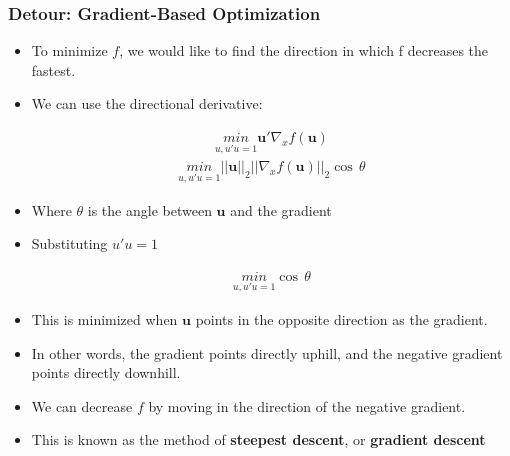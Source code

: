 \documentclass[
  shownotes,
  xcolor={svgnames},
  hyperref={colorlinks,citecolor=DarkBlue,linkcolor=DarkRed,urlcolor=DarkBlue}
  , aspectratio=169]{beamer}
\begin{document}
\begin{frame}[fragile]
\frametitle{Detour: Gradient-Based Optimization}

\begin{itemize}
\item To minimize $f$, we would like to find the direction in which f decreases the fastest. 
\item We can use the directional derivative:

\begin{align}
\underset{u,u'u=1}{min}\mathbf{u}'\nabla_x f(\mathbf{u}) 
\end{align}
\begin{align}
\underset{u,u'u=1}{min}||\mathbf{u}||_2||\nabla_x f(\mathbf{u})||_2 \cos\,\theta 
\end{align}

\item Where $\theta$ is the angle between $\mathbf{u}$ and the gradient
\item Substituting $u'u=1$ 

\begin{align}
\underset{u,u'u=1}{min} \cos\,\theta 
\end{align}

\item This is minimized when $\mathbf{u}$ points in the opposite direction as the gradient.
\item In other words, the gradient points directly uphill, and the negative gradient points directly downhill.
\item We can decrease $f$ by moving in the direction of the negative gradient.
\item This is known as the method of {\bf steepest descent}, or {\bf gradient descent}

\end{itemize}

 
  \end{frame}
\end{document}
